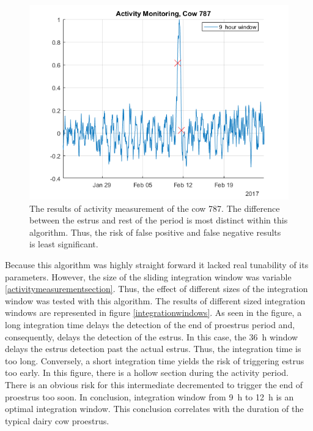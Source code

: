 \documentclass[english,12pt,a4paper,pdftex,elec,utf8]{aaltothesis}
\begin{document}
\begin{figure}[htb]
\centering
\includegraphics[width = 0.75 \textwidth]{figures/ActivityMonitoringCow787.png}
\caption{The results of activity measurement of the cow 787. The difference between the estrus and rest of the period is most distinct within this algorithm. Thus, the risk of false positive and false negative results is least significant.}
\label{ActivityMonitoringCow787}
\end{figure}

Because this algorithm was highly straight forward it lacked real tunability of its parameters. However, the size of the sliding integration window was variable \ref{activitymeasurementsection}. Thus, the effect of different sizes of the integration window was tested with this algorithm. The results of different sized integration windows are represented in figure \ref{integrationwindows}. As seen in the figure, a long integration time delays the detection of the end of proestrus period and, consequently, delays the detection of the estrus. In this case, the \SI{36}{\hour} window delays the estrus detection past the actual estrus. Thus, the integration time is too long. Conversely, a short integration time yields the risk of triggering estrus too early. In this figure, there is a hollow section during the activity period. There is an obvious risk for this intermediate decremented to trigger the end of proestrus too soon. In conclusion, integration window from \SI{9}{\hour} to \SI{12}{\hour} is an optimal integration window. This conclusion correlates with the duration of the typical dairy cow proestrus.
\end{document}
